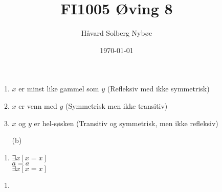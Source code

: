 \documentclass[a4paper, 12pt]{article}  %
\title{FI1005 Øving 8}                         %
\author{Håvard Solberg Nybøe}           %
\date{\today}                           %
\begin{document}
\maketitle


\begin{enumerate}
    \item [\boxed{1}]
    \begin{enumerate}
        \item \(x\) er minst like gammel som \(y\) (Refleksiv med ikke symmetrisk)
        \item \(x\) er venn med \(y\) (Symmetrisk men ikke transitiv)
        \item \(x\) og \(y\) er hel-søsken (Transitiv og symmetrisk, men ikke refleksiv)
    \end{enumerate}
    \item [\boxed{2}]
    \begin{enumerate}
        \item [(b)] 
    \end{enumerate}
    \item [\boxed{3}]
    \begin{enumerate}
        \item \(\exists x [x = x]\) \\
        \(a = a\) \\
        \(\exists x [x = x]\)
    \end{enumerate}
    \item [\boxed{4}]
    \begin{enumerate}
        \item 
    \end{enumerate}
\end{enumerate}

\end{document}
